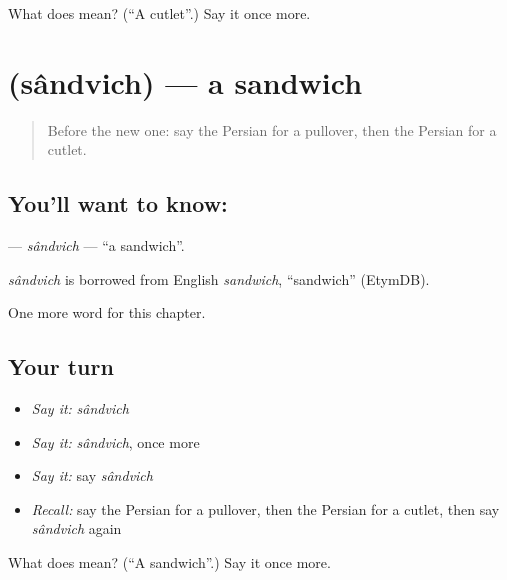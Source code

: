 \begin{tcolorbox}[breakable,colback=teal!4,colframe=teal!35!black,title={Before you move on}]
What does  mean? (\textquotedblleft{}A cutlet\textquotedblright{}.) Say it once more.
\end{tcolorbox}
\section[\texorpdfstring{\fa{ساندویچ} (sândvich)}{ساندویچ (sândvich)}]{ (sândvich) — a sandwich}

\label{lesson:FA-C205-sandvich}



\begin{quote}
Before the new one: say the Persian for a pullover, then the Persian for a cutlet.
\end{quote}

\subsection*{You'll want to know: }
\textbf{} — \emph{sândvich} — \textquotedblleft{}a sandwich\textquotedblright{}.

\begin{cousinweb}
\emph{sândvich} is borrowed from English \emph{sandwich}, \textquotedblleft{}sandwich\textquotedblright{} (EtymDB).
\end{cousinweb}

\begin{grammarlens}[title={What you've built}]
One more word for this chapter.
\end{grammarlens}

\subsection*{Your turn}
\begin{itemize}
\raggedright
  \item \emph{Say it:} \emph{sândvich}
  \item \emph{Say it:} \emph{sândvich}, once more
  \item \emph{Say it:} say \emph{sândvich}
  \item \emph{Recall:} say the Persian for a pullover, then the Persian for a cutlet, then say \emph{sândvich} again
\end{itemize}

\begin{tcolorbox}[breakable,colback=teal!4,colframe=teal!35!black,title={Before you move on}]
What does  mean? (\textquotedblleft{}A sandwich\textquotedblright{}.) Say it once more.
\end{tcolorbox}
